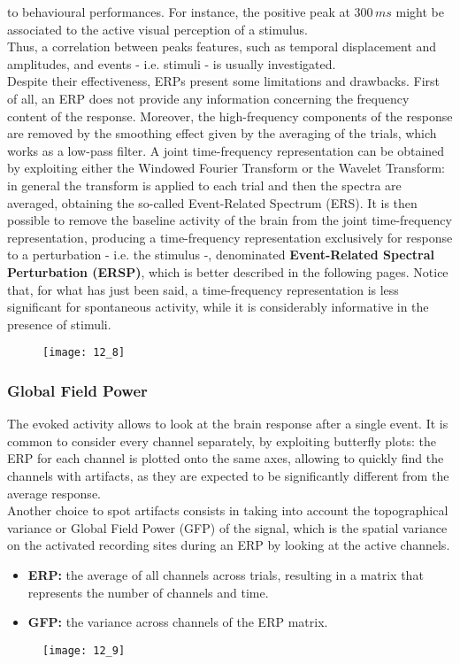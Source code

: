to behavioural performances. For instance, the positive peak at \(300\,ms\) might be associated
to the active visual perception of a stimulus.\\
Thus, a correlation between peaks features, such as temporal displacement and amplitudes,
and events - i.e. stimuli - is usually investigated.\\
Despite their effectiveness, ERPs present some limitations and drawbacks. First of all, an
ERP does not provide any information concerning the frequency content of the response.
Moreover, the high-frequency components of the response are removed by the smoothing effect
given by the averaging of the trials, which works as a low-pass filter. A joint time-frequency
representation can be obtained by exploiting either the Windowed Fourier Transform or the
Wavelet Transform: in general the transform is applied to each trial and then the spectra
are averaged, obtaining the so-called Event-Related Spectrum (ERS). It is then possible
to remove the baseline activity of the brain from the joint time-frequency representation,
producing a time-frequency representation exclusively for response to a perturbation
- i.e. the stimulus -, denominated \textbf{Event-Related Spectral Perturbation (ERSP)}, which is
better described in the following pages.
Notice that, for what has just been said, a time-frequency representation is less significant
for spontaneous activity, while it is considerably informative in the presence of stimuli.
\begin{figure}[H]
    \centering
    \texttt{[image: 12\_8]}
\end{figure}
\subsubsection{Global Field Power}
The evoked activity allows to look at the brain response after a single event. It is
common to consider every channel separately, by exploiting butterfly plots: the ERP for
each channel is plotted onto the same axes, allowing to quickly find the channels with
artifacts, as they are expected to be significantly different from the average response.\\
Another choice to spot artifacts consists in taking into account the topographical variance
or Global Field Power (GFP) of the signal, which is the spatial variance on the activated
recording sites during an ERP by looking at the active channels.
\begin{itemize}
    \item \textbf{ERP:} the average of all channels across trials, resulting in a matrix that
          represents the number of channels and time.
    \item \textbf{GFP:} the variance across channels of the ERP matrix.
\end{itemize}
\begin{figure}[H]
    \centering
    \texttt{[image: 12\_9]}
\end{figure}
